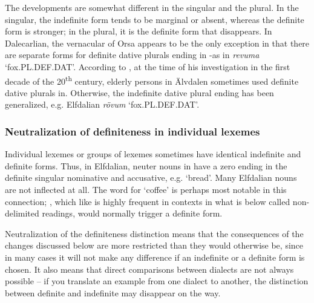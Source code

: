 The developments are somewhat different in the singular and the plural. In the singular, the indefinite form tends to be marginal or absent, whereas the definite form is stronger; in the plural, it is the definite form that disappears. In Dalecarlian,  the vernacular of Orsa appears to be the only exception in that there are separate forms for definite dative plurals ending in \nobreakdash-as in \textit{revuma} ‘fox.PL.DEF.DAT’. According to \citet{Levander1909}, at the time of his investigation in the first decade of the 20\textsuperscript{th} century, elderly persons in Älvdalen sometimes used definite dative plurals in\textstyleLinguisticExample{ }.  Otherwise, the indefinite dative plural ending  has been generalized, e.g. Elfdalian \textit{rövum} ‘fox.PL.DEF.DAT’.

\subsubsection{Neutralization of definiteness in individual lexemes}
Individual lexemes or groups of lexemes sometimes have identical indefinite and definite forms. Thus, in Elfdalian, neuter nouns in have a zero ending in the definite singular nominative and accusative, e.g.  ‘bread’. Many Elfdalian nouns are not inflected at all.  The word for ‘coffee’ is perhaps most notable in this connection; , which like  is highly frequent in contexts in what is below called non-delimited readings, would normally trigger a definite form. 

Neutralization of the definiteness distinction means that the consequences of the changes discussed below are more restricted than they would otherwise be, since in many cases it will not make any difference if an indefinite or a definite form is chosen. It also means that direct comparisons between dialects are not always possible – if you translate an example from one dialect to another, the distinction between definite and indefinite may disappear on the way. 

